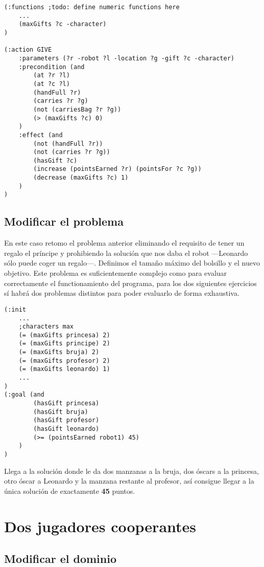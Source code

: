 \documentclass{article}
\begin{document}
\begin{lstlisting}
(:functions ;todo: define numeric functions here
	...
    (maxGifts ?c -character)
)

(:action GIVE
    :parameters (?r -robot ?l -location ?g -gift ?c -character)
    :precondition (and 
        (at ?r ?l)
        (at ?c ?l)
        (handFull ?r)
        (carries ?r ?g)
        (not (carriesBag ?r ?g))
        (> (maxGifts ?c) 0)
    )
    :effect (and 
        (not (handFull ?r))
        (not (carries ?r ?g))
        (hasGift ?c)
        (increase (pointsEarned ?r) (pointsFor ?c ?g))
        (decrease (maxGifts ?c) 1)
    )
)
\end{lstlisting}

\subsection{Modificar el problema}

	En este caso retomo el problema anterior eliminando el requisito de tener un regalo el príncipe  y prohibiendo la solución que nos daba el robot ---Leonardo sólo puede coger un regalo---. Definimos el tamaño máximo del bolsillo y el nuevo objetivo. Este problema es suficientemente complejo como para evaluar correctamente el functionamiento del programa, para los dos siguientes ejercicios sí habrá dos problemas distintos para poder evaluarlo de forma exhaustiva.

\begin{lstlisting}
(:init
	...
	;characters max
    (= (maxGifts princesa) 2)
    (= (maxGifts principe) 2)
    (= (maxGifts bruja) 2)
    (= (maxGifts profesor) 2)
    (= (maxGifts leonardo) 1)
	...
)
(:goal (and
        (hasGift princesa)
        (hasGift bruja)
        (hasGift profesor)
        (hasGift leonardo)
        (>= (pointsEarned robot1) 45)
    )
)   
\end{lstlisting}

Llega a la solución donde le da dos manzanas a la bruja, dos óscars a la princesa, otro óscar a Leonardo y la manzana restante al profesor, así consigue llegar a la única solución de exactamente \textbf{45} puntos.

\section{Dos jugadores cooperantes}

\subsection{Modificar el dominio}
\end{document}
